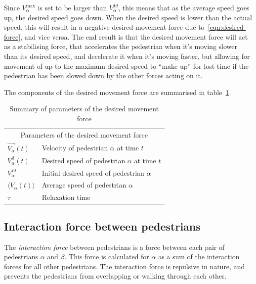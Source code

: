 Since $V^{\text{max}}_\alpha$ is set to be larger than $V^{Id}_\alpha$, this 
means that as the average speed goes up, the desired speed goes down.  When 
the desired speed is lower than the actual speed, this will result in a 
negative desired movement force due to~\eqref{eqn:desired-force}, and vice 
versa. The end result is that the desired movement force will act as a 
stabilising force, that accelerates the pedestrian when it's moving slower 
than its desired speed, and decelerate it when it's moving faster, but 
allowing for movement of up to the maximum desired speed to ``make up'' for 
lost time if the pedestrian has been slowed down by the other forces acting on 
it.

The components of the desired movement force are summarised in 
table~\ref{tbl:desired-force}.

\begin{table}[h]
    \centering
    \begin{tabular}{l l}
        \toprule
        \multicolumn{2}{c}{\textsf{Parameters of the desired movement force}}\\
        $\overrightarrow{V_{\alpha}}(t)$ & Velocity of pedestrian $\alpha$ 
        at time $t$\\
        $V_{\alpha}^{d}(t)$ & Desired speed of pedestrian $\alpha$ at time 
        $t$\\
        $V_{\alpha}^{Id}$ & Initial desired speed of pedestrian $\alpha$ \\
        $\langle V_{\alpha}(t) \rangle$ & Average speed of pedestrian 
        $\alpha$ \\
        $\tau$& Relaxation time \\
        \bottomrule
    \end{tabular}
    \caption{Summary of parameters of the desired movement force}
    \label{tbl:desired-force}
\end{table}

\subsection{Interaction force between pedestrians}
\label{seq:interaction-pedestrians}
The \emph{interaction force} between pedestrians is a force between each pair 
of pedestrians $\alpha$ and $\beta$. This force is calculated for $\alpha$ as 
a sum of the interaction forces for all other pedestrians. The interaction 
force is repulsive in nature, and prevents the pedestrians from overlapping or 
walking through each other.

